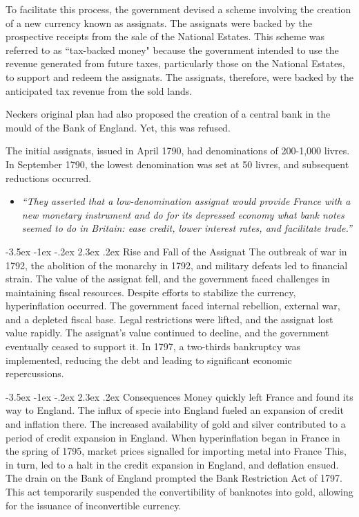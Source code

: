 \documentclass[]{article}
\makeatletter
\newcommand{\bb}{\bigbreak\noindent}
\renewcommand\section{\leftskip 0pt\@startsection {section}{1}{\z@}%
	{-3.5ex \@plus -1ex \@minus -.2ex}%
	{2.3ex \@plus.2ex}%
	{\normalfont\Large\bfseries}}
\makeatother
\begin{document}
	\bb 
	To facilitate this process, the government devised a scheme involving the creation of a new currency known as assignats. The assignats were backed by the prospective receipts from the sale of the National Estates.
	\bb
	This scheme was referred to as ``tax-backed money" because the government intended to use the revenue generated from future taxes, particularly those on the National Estates, to support and redeem the assignats. The assignats, therefore, were backed by the anticipated tax revenue from the sold lands.
	 
	\bb
	 Neckers original plan had also proposed the creation of a central bank in the mould of the Bank of England. Yet, this was refused.
	 
	 \bb
	 The initial assignats, issued in April 1790, had denominations of 200-1,000 livres. In September 1790, the lowest denomination was set at 50 livres, and subsequent reductions occurred. 
	 \begin{itemize}
	 	\item \textit{``They asserted that a low-denomination assignat would provide France with a new monetary instrument and do for its depressed economy what bank notes seemed to do in Britain: ease credit, lower interest rates,
	 	and facilitate trade.''}
	 \end{itemize}

	\section{Rise and Fall of the Assignat}
	The outbreak of war in 1792, the abolition of the monarchy in 1792, and military defeats led to financial strain. The value of the assignat fell, and the government faced challenges in maintaining fiscal resources.
	\bb
	Despite efforts to stabilize the currency, hyperinflation occurred. The government faced internal rebellion, external war, and a depleted fiscal base. Legal restrictions were lifted, and the assignat lost value rapidly.
	\bb
	The assignat's value continued to decline, and the government eventually ceased to support it. In 1797, a two-thirds bankruptcy was implemented, reducing the debt and leading to significant economic repercussions.
	
	\section{Consequences}
	Money quickly left France and found its way to England.
	\bb
	The influx of specie into England fueled an expansion of credit and inflation there. The increased availability of gold and silver contributed to a period of credit expansion in England.
	\bb
	When hyperinflation began in France in the spring of 1795, market prices signalled for importing metal into France This, in turn, led to a halt in the credit expansion in England, and deflation ensued.
	\bb
	The drain on the Bank of England prompted the Bank Restriction Act of 1797. This act temporarily suspended the convertibility of banknotes into gold, allowing for the issuance of inconvertible currency.
\end{document}
